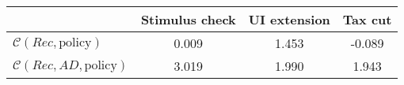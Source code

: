 \begin{tabular}{@{}lccc@{}} 
\toprule 
                          & Stimulus check      & UI extension    & Tax cut    \\  \midrule 
$\mathcal{C}(Rec,\text{policy})$ & 0.009  & 1.453  & -0.089     \\ 
$\mathcal{C}(Rec, AD,\text{policy})$ & 3.019  & 1.990  & 1.943     \\ 
\end{tabular}  
